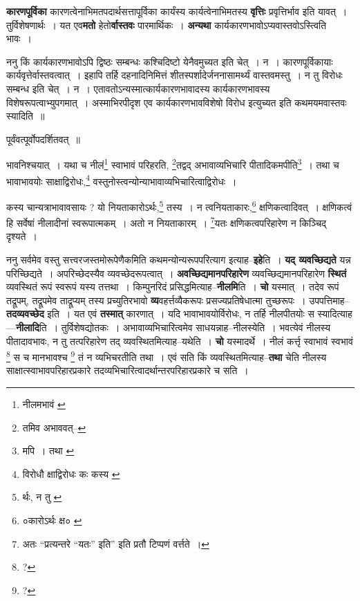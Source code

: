 \documentclass[article,12pt,a4paper]{memoir}
\begin{document}
	  \endgroup
	

	  \pstart \textbf{कारणपूर्विका} कारणत्वेनाभिमतपदार्थसत्तापूर्विका कार्यंस्य कार्यत्वेनाभिमतस्य \textbf{वृत्तिः} प्रवृत्तिर्भाव इति यावत् । तुर्विशेषणार्थः । यत एव\textbf{मतो} हेतो\textbf{र्वास्तवः} पारमार्थिकः । \textbf{अन्यथा} कार्यकारणभावोऽप्यवास्तवोऽस्त्विति भावः ।
	\pend
      

	  \pstart ननु किं कार्यकारणभावोऽपि द्विष्ठः सम्बन्धः कश्चिदिष्टो येनैवमुच्यत इति चेत् । न । कारणपूर्विकायाः कार्यवृत्तेर्वास्तवत्वात् । इहापि तर्हि दहनादिनिमित्तं शीतस्पर्शादेर्जननासामर्थ्यं वास्तवमस्तु । न तु विरोधः सम्बन्ध इति चेत् । न । एतावतोऽन्यस्मात्कार्यकारणभावादस्य कार्यकारणभावस्य विशेषरूपत्वाभ्युपगमात् । अस्माभिरपीदृश एव कार्यकारणभावविशेषो विरोध इत्युच्यत इति कथमयमवास्तवः स्यादिति ॥
	\pend
      

	  \pstart पूर्वंवत्पूर्वोपदर्शितवत् ॥
	\pend
	  \bigskip
	  \begingroup
	

	  \pstart भावनिश्चयात् । यथा च नीलं\footnote{नीलमभावं \cite{dp-msA} \cite{dp-msB} \cite{dp-msC} \cite{dp-edP} \cite{dp-edH}} स्वाभावं परिहरति, \footnote{तमिव अभाववत्--\cite{dp-msD-n}}\-तद्वद् अभावाव्यभिचारि पीतादिकमपीति\footnote{मपि । तथा \cite{dp-msA} \cite{dp-msB} \cite{dp-edP} \cite{dp-edH} \cite{dp-edE} \cite{dp-edN}} । तथा च भावाभावयोः साक्षाद्विरोधः,\footnote{विरोधौ \cite{dp-msA} क्षाद्विरोधः कः कस्य \cite{dp-msB}} वस्तुनोस्त्वन्योन्याभावाव्यभिचारित्वाद्विरोधः ।
	\pend
       

	  \pstart कस्य चान्यत्राभावावसायः ? यो नियताकारोऽर्थः,\footnote{र्थः, न तु \cite{dp-edE}} तस्य । न त्वनियताकारः,\footnote{०कारोऽर्थः क्ष० \cite{dp-msA} \cite{dp-msB} \cite{dp-edP} \cite{dp-edH} \cite{dp-edE} \cite{dp-edN}} क्षणिकत्वादिवत् । क्षणिकत्वं हि सर्वेषां नीलादीनां स्वरूपात्मकम् । अतो न नियताकारम् । \footnote{अतः \cite{dp-msD} \cite{dp-edE} “प्रत्यन्तरे “यतः” इति” इति \cite{dp-msD} प्रतौ टिप्पणं वर्त्तते ।}\-यतः क्षणिकत्वपरिहारेण न किञ्चिद् दृश्यते ।
	\pend
      
	  \endgroup
	

	  \pstart ननु सर्वमेव वस्तु सत्त्वरजस्तमोरूपेणैकमिति कथमन्योन्यरूपपरित्याग इत्याह--\textbf{इहे}ति । \textbf{यद् व्यवच्छिद्यते} यन्न परिच्छिद्यते । अपरिच्छेदस्यैव व्यवच्छेदरूपत्वात् । \textbf{अवच्छिद्यमानपरिहारेण} व्यवच्छिद्यमानपरिहारेण \textbf{स्थितं} व्यवस्थितं रूपं स्वरूपं यस्य तत्तथा । किम्पुनरिदं प्रसिद्धमित्याह--\textbf{नीलमि}ति । \textbf{चो} यस्मात् । तदेव रूपं तद्रूपम्, तद्रूपमेव ताद्रूप्यम् तस्य प्रच्युतिरभावो \textbf{व्य}वहर्त्तव्यैकरूपः प्रसज्यप्रतिषेधात्मा तुच्छरूपः । उपपत्तिमाह--\textbf{तदव्यवच्छेद} इति । यत एवं \textbf{तस्मात्} कारणात् । यदि भावाभावयोर्विरोधः, न तर्हि नीलपीतयोः स स्यादित्याह—\textbf{नीलादि}ति । तुर्विशेषद्योतकः । अभावाव्यभिचारित्वमेव साधयन्नाह--नीलस्येति । भवत्येवं नीलस्य पीतादावभावः, न तु तत्परिहारेण तद् व्यवस्थितमित्याह--यथेति । \textbf{चो} यस्मादर्थे । नीलं कर्त्तृ स्वाभावं स्वभावं \footnote{?} स च मानभावश्च \footnote{?} तं न व्यभिचरतीति तथा । एवं सति किं व्यवस्थितमित्याह--\textbf{तथा} चेति नीलस्य साक्षात्स्वाभावपरिहारप्रकारे तदव्यभिचारित्वादर्थान्तरपरिहारप्रकारे च सति ।
	\pend
      
\end{document}
